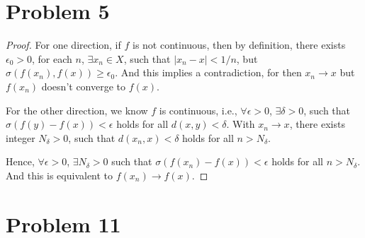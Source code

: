 \documentclass[12pt]{article}
\begin{document}
\section*{Problem 5}

\begin{proof}

For one direction, if $f$ is not continuous, then by definition, there exists $\epsilon_0 > 0$, for each $n$, $\exists x_n \in X$, such that $|x_n - x| < 1/n$, but $\sigma (f(x_n), f(x)) \geqslant \epsilon_0$. And this implies a contradiction, for then $x_n \rightarrow x$ but $f(x_n)$ doesn't converge to $f(x)$.

For the other direction, we know $f$ is continuous, i.e.,  $\forall \epsilon > 0$, $\exists \delta > 0$, such that $\sigma (f(y) - f(x)) < \epsilon$ holds for all $d(x, y) < \delta$. With $x_n \rightarrow x$, there exists integer $N_\delta > 0$, such that $d(x_n , x) < \delta$ holds for all $n > N_\delta$.

Hence, $\forall \epsilon > 0$, $\exists N_\delta > 0$ such that $\sigma (f(x_n) - f(x)) < \epsilon$ holds for all $n > N_\delta$. And this is equivalent to $f(x_n) \rightarrow f(x)$.

\end{proof}

\section*{Problem 11}
\end{document}
